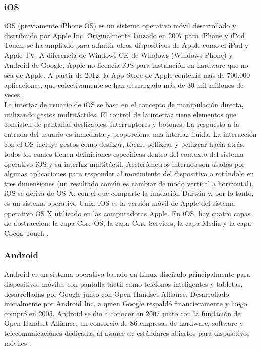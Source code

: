 \subsubsection{iOS}

iOS (previamente iPhone OS) es un sistema operativo móvil desarrollado y distribuido por Apple Inc. Originalmente lanzado en 2007 para iPhone y iPod Touch, se ha ampliado para admitir otros dispositivos de Apple como el iPad y Apple TV. A diferencia de Windows CE de Windows (Windows Phone) y Android de Google, Apple no licencia iOS para instalación en hardware que no sea de Apple. A partir de 2012, la App Store de Apple contenía más de 700,000 aplicaciones, que colectivamente se han descargado más de 30 mil millones de veces \cite{MBPDO}.\\

La interfaz de usuario de iOS se basa en el concepto de manipulación directa, utilizando gestos multitáctiles. El control de la interfaz tiene elementos que consisten de pantallas deslizables, interruptores y botones. La respuesta a la entrada del usuario es inmediata y proporciona una interfaz fluida. La interacción con el OS incluye gestos como deslizar, tocar, pellizcar y pellizcar hacia atrás, todos los cuales tienen definiciones específicas dentro del contexto del sistema operativo iOS y su interfaz multitáctil. Acelerómetros internos son usados por algunas aplicaciones para responder al movimiento del dispositivo o rotándolo en tres dimensiones (un resultado común es cambiar de modo vertical a horizontal). iOS se deriva de OS X, con el que comparte la fundación Darwin y, por lo tanto, es un sistema operativo Unix. iOS es la versión móvil de Apple del sistema operativo OS X utilizado en las computadoras Apple. En iOS, hay cuatro capas de abstracción: la capa Core OS, la capa Core Services, la capa Media y la capa Cocoa Touch \cite{MBPDO}.\\


\subsubsection{Android}

Android es un sistema operativo basado en Linux diseñado principalmente para dispositivos móviles con pantalla táctil como teléfonos inteligentes y tabletas, desarrolladas por Google junto con Open Handset Alliance. Desarrollado inicialmente por Android Inc, a quien Google respaldó financieramente y luego compró en 2005. Android se dio a conocer en 2007 junto con la fundación de Open Handset Alliance, un consorcio de 86 empresas de hardware, software y telecomunicaciones dedicadas al avance de estándares abiertos para dispositivos móviles \cite{MBPDO}.\\
 
